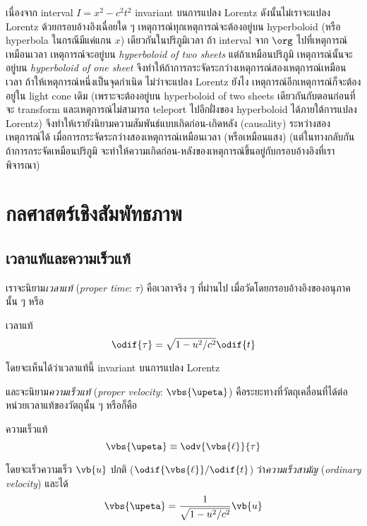 เนื่องจาก interval $I = x^2 - c^2t^2$ invariant บนการแปลง Lorentz ดังนั้นไม่เราจะแปลง Lorentz ด้วยกรอบอ้างอิงเฉื่อยใด ๆ เหตุการณ์ทุกเหตุการณ์จะต้องอยู่บน hyperboloid (หรือ hyperbola ในกรณีมีแค่แกน $x$) เดียวกันในปริภูมิเวลา ถ้า interval จาก $\org$ ไปที่เหตุการณ์เหมือนเวลา เหตุการณ์จะอยู่บน \emph{hyperboloid of two sheets} แต่ถ้าเหมือนปริภูมิ เหตุการณ์นั้นจะอยู่บน \emph{hyperboloid of one sheet} จึงทำให้ถ้าการกระจัดระกว่างเหตุการณ์สองเหตุการณ์เหมือนเวลา ถ้าให้เหตุการณ์หนึ่งเป็นจุดกำเนิด ไม่ว่าจะแปลง Lorentz ยังไง เหตุการณ์อีกเหตุการณ์ก็จะต้องอยู่ใน light cone เดิม (เพราะจะต้องอยู่บน hyperboloid of two sheets เดียวกันกับตอนก่อนที่จะ transform และเหตุการณ์ไม่สามารถ teleport ไปอีกฝั่งของ hyperboloid ได้ภายใต้การแปลง Lorentz) จึงทำให้เรายังนิยามความสัมพันธ์แบบเกิดก่อน-เกิดหลัง (causality) ระหว่างสองเหตุการณ์ได้ เมื่อการกระจัดระกว่างสองเหตุการณ์เหมือนเวลา (หรือเหมือนแสง) (แต่ในทางกลับกัน ถ้าการกระจัดเหมือนปริภูมิ จะทำให้ความเกิดก่อน-หลังของเหตุการณ์ขึ้นอยู่กับกรอบอ้างอิงที่เราพิจารณา)

\section{กลศาสตร์เชิงสัมพัทธภาพ}

\subsection{เวลาแท้และความเร็วแท้}

เราจะนิยาม\emph{เวลาแท้} (\emph{proper time}: $\tau$) คือเวลาจริง ๆ ที่ผ่านไป เมื่อวัดโดยกรอบอ้างอิงของอนุภาคนั้น ๆ หรือ
\begin{defbox}{เวลาแท้}
    \begin{equation}
        \odif{\tau} = \sqrt{1 - u^2/c^2}\odif{t}
    \end{equation}
\end{defbox}
โดยจะเห็นได้ว่าเวลาแท้นี้ invariant บนการแปลง Lorentz

และจะนิยาม\emph{ความเร็วแท้} (\emph{proper velocity}: $\vbs{\upeta}$) คือระยะทางที่วัตถุเคลื่อนที่ได้ต่อหน่วยเวลาแท้ของวัตถุนั้น ๆ หรือก็คือ
\begin{defbox}{ความเร็วแท้}
    \begin{equation}
        \vbs{\upeta} \equiv \odv{\vbs{\ell}}{\tau}
    \end{equation}
\end{defbox}
โดยจะเร็วความเร็ว $\vb{u}$ ปกติ ($\odif{\vbs{\ell}}/\odif{t}$) ว่า\emph{ความเร็วสามัญ} (\emph{ordinary velocity}) และได้
\begin{equation}
    \vbs{\upeta} = \frac{1}{\sqrt{1 - u^2/c^2}}\vb{u}
\end{equation}

